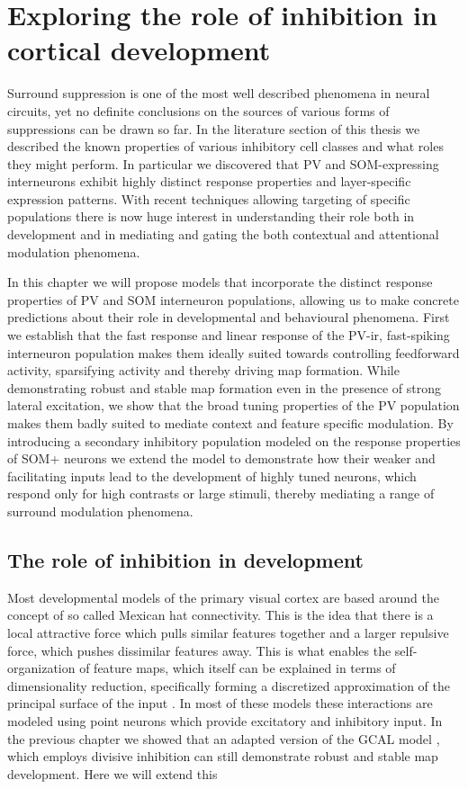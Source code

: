 \chapter{Exploring the role of inhibition in cortical development}

Surround suppression is one of the most well described phenomena in
neural circuits, yet no definite conclusions on the sources of various
forms of suppressions can be drawn so far. In the literature section
of this thesis we described the known properties of various inhibitory
cell classes and what roles they might perform. In particular we
discovered that PV and SOM-expressing interneurons exhibit highly
distinct response properties and layer-specific expression patterns.
With recent techniques allowing targeting of specific populations
there is now huge interest in understanding their role both in
development and in mediating and gating the both contextual and
attentional modulation phenomena.

In this chapter we will propose models that incorporate the distinct
response properties of PV and SOM interneuron populations, allowing us
to make concrete predictions about their role in developmental and
behavioural phenomena. First we establish that the fast response and
linear response of the PV-ir, fast-spiking interneuron population
makes them ideally suited towards controlling feedforward activity,
sparsifying activity and thereby driving map formation. While
demonstrating robust and stable map formation even in the presence of
strong lateral excitation, we show that the broad tuning properties of
the PV population makes them badly suited to mediate context and
feature specific modulation. By introducing a secondary inhibitory
population modeled on the response properties of SOM+ neurons we
extend the model to demonstrate how their weaker and facilitating
inputs \citep{Bartley2008,Beierlein2003,Bartley2008,Tan2008} lead to
the development of highly tuned neurons, which respond only for high
contrasts or large stimuli, thereby mediating a range of surround
modulation phenomena.

\section{The role of inhibition in development}

Most developmental models of the primary visual cortex are based
around the concept of so called Mexican hat connectivity. This is the
idea that there is a local attractive force which pulls similar
features together and a larger repulsive force, which pushes
dissimilar features away. This is what enables the self-organization
of feature maps, which itself can be explained in terms of
dimensionality reduction, specifically forming a discretized
approximation of the principal surface of the input
\citep{Ritter1992}. In most of these models \citep{Miller1994,
  Miikkulainen2005} these interactions are modeled using point neurons
which provide excitatory and inhibitory input. In the previous chapter
we showed that an adapted version of the GCAL model
\citep{Stevens2013}, which employs divisive inhibition can still
demonstrate robust and stable map development. Here we will extend
this


